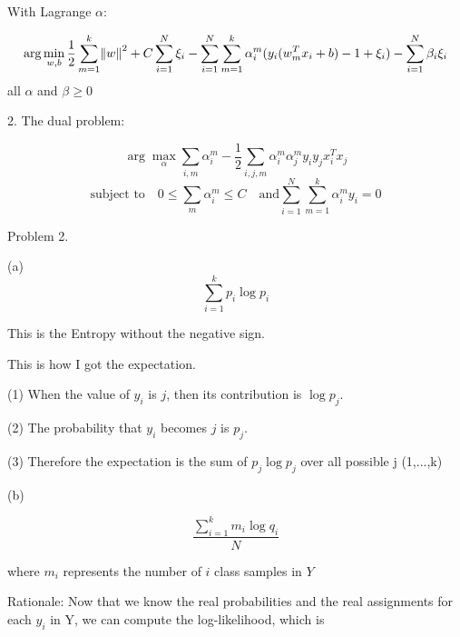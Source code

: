 \documentclass[11pt]{article}
\theoremstyle{definition}
\begin{document}
With Lagrange $\alpha$:

\begin{equation*}
\arg \min_{w,b} \frac{1}{2} \sum_{m=1}^{k} \norm{w}^2 + C \sum_{i=1}^{N}\xi_i
- \sum_{i=1}^{N}\sum_{m=1}^{k}\alpha_{i}^{m}(y_i(w_m^T x_i + b) -1 + \xi_i)
- \sum_{i=1}^{N}\beta_i\xi_i
\end{equation*}
all $\alpha$ and $\beta \ge 0$

\bigskip


2. The dual problem:

\begin{equation*}
\arg \max_\alpha \sum_{i,m} \alpha_{i}^{m} - \frac{1}{2} \sum_{i,j,m} \alpha_{i}^{m} \alpha_{j}^{m} y_i y_j x_i^T x_j
\end{equation*}
\begin{equation*}
\text{subject to} \quad 0 \le \sum_{m}\alpha_{i}^{m} \le C \quad \text{and} \sum_{i=1}^{N}\sum_{m=1}^{k} \alpha_{i}^{m} y_i =0 
\end{equation*}

\pagebreak

Problem 2.

\bigskip

(a)
\begin{equation*}
\sum_{i=1}^{k}p_i \log p_i
\end{equation*}


This is the Entropy without the negative sign.

This is how I got the expectation.

(1) When the value of $y_i$ is $j$, then its contribution is $\log p_j$.

(2) The probability that $y_i$ becomes $j$ is $p_j$.

(3) Therefore the expectation is the sum of $p_j \log p_j$ over all possible j (1,...,k)

\bigskip
(b)

\begin{equation*}
 \frac{\sum_{i=1}^{k} m_i \log q_i}{N} 
\end{equation*}

 where $m_i$ represents the number of $i$ class samples in $Y$

\bigskip

Rationale: Now that we know the real probabilities and the real assignments for each $y_i$ in Y, we can compute the log-likelihood, which is
\end{document}
